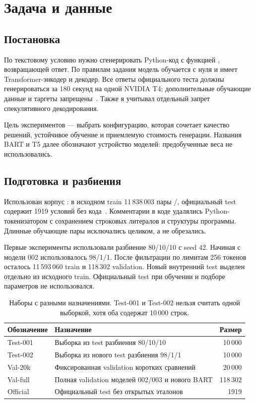 \section{Задача и данные}

\subsection{Постановка}
По текстовому условию нужно сгенерировать Python-код с функцией
, возвращающей ответ. По правилам задания модель обучается
с нуля и имеет Transformer-энкодер и декодер. Все ответы официального
теста должны генерироваться за 180 секунд на одной NVIDIA T4;
дополнительные обучающие данные и таргеты запрещены~\cite{assignment}.
Также я учитывал отдельный запрет спекулятивного декодирования.

Цель экспериментов --- выбрать конфигурацию, которая сочетает качество
решений, устойчивое обучение и приемлемую стоимость генерации.
Названия BART и T5 далее обозначают устройство моделей:
предобученные веса не использовались.

\subsection{Подготовка и разбиения}
Использован корпус : в исходном train
11\,838\,003 пары /, официальный test содержит
1919 условий без кода~\cite{dataset}. Комментарии в коде удалялись
Python-токенизатором с сохранением строковых литералов и структуры
программы. Длинные обучающие пары исключались целиком, а не обрезались.

Первые эксперименты использовали разбиение 80/10/10 с seed 42.
Начиная с модели 002 использовалось 98/1/1. После фильтрации по лимитам
256 токенов осталось 11\,593\,060 train и 118\,302 validation.
Новый внутренний test выделен отдельно из исходного train.
Официальный test при обучении и подборе параметров не использовался.

\begin{table}[htbp]
\centering\small
\begin{tabularx}{\linewidth}{lXr}
\toprule
Обозначение & Назначение & Размер \\
\midrule
Test-001 & Выборка из test разбиения 80/10/10 & 10\,000 \\
Test-002 & Выборка из нового test разбиения 98/1/1 & 10\,000 \\
Val-20k & Фиксированная validation коротких сравнений & 20\,000 \\
Val-full & Полная validation моделей 002/003 и нового BART & 118\,302 \\
Official & Официальный test без открытых эталонов & 1919 \\
\bottomrule
\end{tabularx}
\caption{Наборы с разными назначениями. Test-001 и Test-002 нельзя считать
одной выборкой, хотя оба содержат 10\,000 строк.}
\label{tab:splits}
\end{table}

